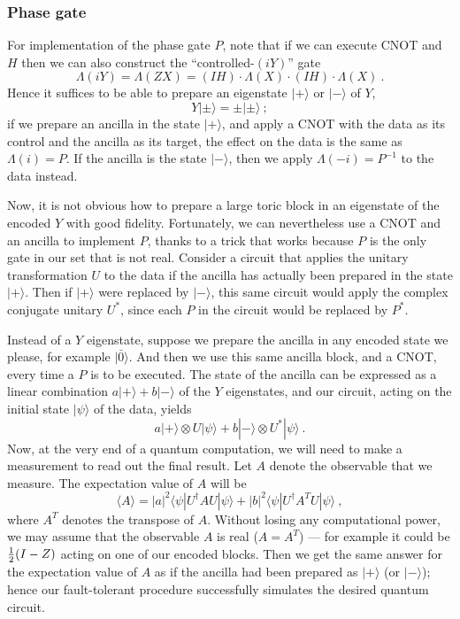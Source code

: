 \subsubsection{Phase gate}
For implementation of the phase gate $P$, note that if we can execute CNOT and $H$ then we can also construct the ``controlled-$(iY)$'' gate 
\begin{equation}
\Lambda(iY)= \Lambda(ZX)= (IH)\cdot\Lambda(X)\cdot(IH)\cdot\Lambda(X)~.
\end{equation}
Hence it suffices to be able to prepare an eigenstate $|+\rangle$ or $|-\rangle$ of $Y$,
\begin{equation}
Y|\pm\rangle = \pm |\pm\rangle~;
\end{equation}
if we prepare an ancilla in the state $|+\rangle$, and apply a CNOT with the data as its control and the ancilla as its target, the effect on the data is the same as $\Lambda(i)=P$. If the ancilla is the state $|-\rangle$, then we apply $\Lambda(-i)=P^{-1}$ to the data instead.

Now, it is not obvious how to prepare a large toric block in an eigenstate of the encoded $ Y$ with good fidelity. Fortunately, we can nevertheless use a CNOT and an ancilla to implement $P$, thanks to a trick that works because $P$ is the only gate in our set that is not real. Consider a circuit that applies the unitary transformation $U$ to the data if the ancilla has actually been prepared in the state $|+\rangle$. Then if $|+\rangle$ were replaced by $|-\rangle$, this same circuit would apply the complex conjugate unitary $U^*$, since each $P$ in the circuit would be replaced by $P^*$.

Instead of  a $Y$ eigenstate, suppose we prepare the ancilla in any encoded state we please, for example $|\bar 0\rangle$. And then we use this same ancilla block, and a CNOT, every time a $P$ is to be executed. The state of the ancilla can be expressed as a linear combination $a|+\rangle + b |-\rangle$ of the $Y$ eigenstates, and our circuit, acting on the initial state $|\psi\rangle$ of the data, yields 
\begin{equation}
a|+\rangle \otimes U|\psi\rangle + b|-\rangle\otimes U^*|\psi\rangle~.
\end{equation}
Now, at the very end of a quantum computation, we will need to make a measurement to read out the final result. Let $A$ denote the observable that we measure. The expectation value of $A$ will be 
\begin{equation}
\langle A\rangle = |a|^2 \langle\psi |U^\dagger A U|\psi\rangle +|b|^2 \langle \psi| U^\dagger A^T U|\psi\rangle~,
\end{equation}
where $A^T$ denotes the transpose of $A$. Without losing any computational power, we may assume that the observable $A$ is real ($A=A^T$) --- for example it could be ${1\over 2}(I-Z)$ acting on one of our encoded blocks. Then we get the same answer for the expectation value of $A$ as if the ancilla had been prepared as $|+\rangle$ (or $|-\rangle$); hence our fault-tolerant procedure successfully simulates the desired quantum circuit.

